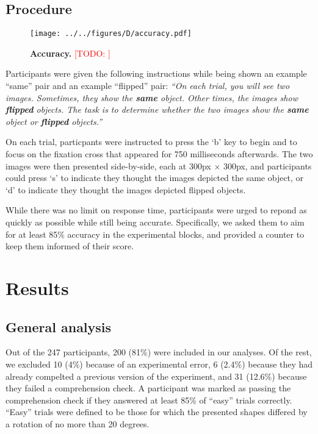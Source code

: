 \documentclass[10pt,letterpaper]{article}
\newcommand{\TODO}[1]{\textcolor{red}{[TODO: #1]}}
\begin{document}
\subsection{Procedure}

\begin{figure*}[t]
  \begin{center}
    \texttt{[image: ../../figures/D/accuracy.pdf]}
    \caption{\textbf{Accuracy.} \TODO{}}
    \label{fig:accuracy}
  \end{center}
\end{figure*}

Participants were given the following instructions while being shown
an example ``same'' pair and an example ``flipped'' pair: \textit{``On
  each trial, you will see two images. Sometimes, they show the
  \textbf{same} object. Other times, the images show \textbf{flipped}
  objects. The task is to determine whether the two images show the
  \textbf{same} object or \textbf{flipped} objects.''}

On each trial, particpants were instructed to press the `b' key to
begin and to focus on the fixation cross that appeared for 750
milliseconds afterwards. The two images were then presented
side-by-side, each at 300px $\times$ 300px, and participants could
press `s' to indicate they thought the images depicted the same
object, or `d' to indicate they thought the images depicted flipped
objects.

While there was no limit on response time, participants were urged to
repond as quickly as possible while still being
accurate. Specifically, we asked them to aim for at least 85\%
accuracy in the experimental blocks, and provided a counter to keep
them informed of their score.

\section{Results}

\subsection{General analysis}

Out of the 247 participants, 200 (81\%) were included in our
analyses. Of the rest, we excluded 10 (4\%) because of an experimental
error, 6 (2.4\%) because they had already compelted a previous version
of the experiment, and 31 (12.6\%) because they failed a comprehension
check. A participant was marked as passing the comprehension check if
they answered at least 85\% of ``easy'' trials correctly. ``Easy''
trials were defined to be those for which the presented shapes
differed by a rotation of no more than 20 degrees.
\end{document}
